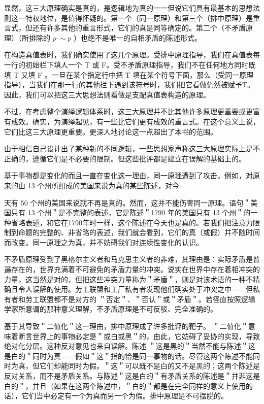 显然，这三大原理确实是真的，是逻辑地为真的一一但说它们具有最基本的思想法则这一特权地位，是值得怀疑的。第一个（同一原理）和第三个（排中原理）是重言式，但还有许多其他的重言形式，它们的真是同等确定的。第二个（不矛盾原理）（所排除的 $p \cdot \sim p$ ）也绝不是唯一的自相矛盾的陈述形式。

在构造真值表时，我们确实使用了这几个原理。受排中原理指导，我们在真值表每一行的初始栏下填人一个 T 或 F。受不矛盾原理指导，我们不在任何地方同时既填 T 又填 F 。一旦在某个指定行中把 T 填在某个符号下面，那么（受同一原理指导），当我们在那一行的其他栏下遇到该符号时，我们把它看做仍然被赋予T。因此，我们可以把这三大思想法则看做是支配真值表构造的原理。

不过，在考虑整个演绎逻辑体系时，这三大原理并不比其他许多原理更重要或更富有成效。确实，为演绎起见，有一些比它们更有成效的重言式。在这个意义上说，它们比这三大原理更重要。更深人地讨论这一点超出了本书的范围。\cite{hamilton1833}

由于相信自己设计出了某种新的不同逻辑，一些思想家声称这三大原理实际上是不正确的，遵循它们是不必要的限制。但这些批评都是建立在误解的基础上的。

基于事物都是变化的而且一直在变化这一理由，同一原理遭到了攻击。例如，对原来的由 13 个州所组成的美国来说为真的某些陈述，对今

天有 50 个州的美国来说就不再是真的。然而，这并不能伤害同一原理。语句＂美国只有 13 个州＂是不完整的表述，它是陈述＂1790 年的美国只有 13 个州＂的一种省略表述，和它在1790年时一样，这个陈述在今天也是真的。若我们把注意力限制到命题的完整的、非省略的表述，我们就会看到，它们的真（或假）并不随时间而改变。同一原理之为真，并不妨碍我们对连续性变化的认识。

不矛盾原理受到了黑格尔主义者和马克思主义者的非难，其理由是：实际矛盾是普遍存在的，世界充满着不可避免的矛盾力量的冲突。说实在世界中存在着相冲突的力量，这当然是对的，但把这些冲突力量称为＂矛盾＂，则是对该术语的一种不精确且令人误解的使用。劳工联盟和工厂私有者发现他们确实处于冲突之中——但私有者和劳工联盟都不是对方的 ＂否定＂、＂否认＂或＂矛盾＂。若径直按照逻辑学家所意谓的那种意义理解，不矛盾原理是不可反驳、完全准确的。

基于其导致＂二值化＂这一理由，排中原理成了许多批评的靶子。 ＂二值化＂意味着断言世界上的事物必定是＂或白或黑＂的，由此，它妨碍了妥协的实现，导致绝对化分层。这种反对意见也来自误解。陈述 ＂这是黑的＂当然不能与陈述＂这是白的＂同时为真——假如＂这＂指的恰是同一事物的话。尽管这两个陈述不能同时为真，但它们却能同时为假。＂这＂可以既不是白的又不是黑的；这两个陈述是反对关系，而不是矛盾关系。与陈述＂这是白的＂有矛盾关系的陈述是＂并非这是白的＂，并且（如果在这两个陈述中，＂白的＂都是在完全同样的意义上使用的话），它们当中必定有一个为真而另一个为假。排中原理是不可摆脱的。


